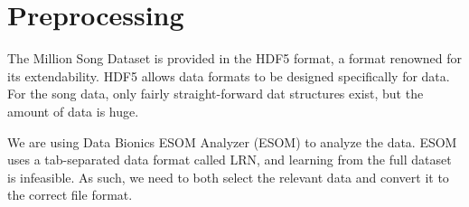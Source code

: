 \section{Preprocessing} %
\label{sec:preprocessing}

The Million Song Dataset is provided in the HDF5 format, a format renowned for its extendability. HDF5
allows data formats to be designed specifically for data. \citep{hdfgrp} For the song data, only fairly straight-forward dat
structures exist, but the amount of data is huge.

We are using Data Bionics ESOM Analyzer (ESOM) to analyze the data. ESOM uses a tab-separated data format called LRN, and learning
from the full dataset is infeasible. As such, we need to both select the relevant data and convert it to the correct file format.



